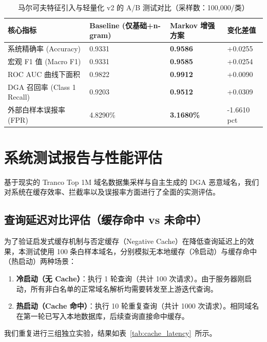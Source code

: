 \documentclass[11pt,a4paper]{ctexart}
\begin{document}
\begin{table}[H]
    \centering
    \color{Charcoal}
    \caption{马尔可夫特征引入与轻量化 v2 的 A/B 测试对比（采样数：100,000/类）}
    \vspace{0.2cm}
    \begin{tabularx}{\textwidth}{lXXX}
        \toprule
        \textbf{核心指标} & \textbf{Baseline (仅基础+n-gram)} & \textbf{Markov 增强方案} & \textbf{变化差值} \\
        \midrule
        系统精确率 (Accuracy) & 0.9331 & \textbf{0.9586} & +0.0255 \\
        宏观 F1 值 (Macro F1) & 0.9331 & \textbf{0.9585} & +0.0254 \\
        ROC AUC 曲线下面积 & 0.9822 & \textbf{0.9912} & +0.0090 \\
        DGA 召回率 (Class 1 Recall) & 0.9203 & \textbf{0.9512} & +0.0309 \\
        外部白样本误报率 (FPR) & 4.8290\% & \textbf{3.1680\%} & -1.6610 pct \\
        \bottomrule
    \end{tabularx}
    \label{tab:ab_test}
\end{table}

\newpage

\section{系统测试报告与性能评估}
基于现实的 Tranco Top 1M 域名数据集采样与自主生成的 DGA 恶意域名，我们对系统在缓存效率、拦截率以及误报率方面进行了全面的实测评估。

\subsection{查询延迟对比评估（缓存命中 vs 未命中）}
为了验证启发式缓存机制与否定缓存（Negative Cache）在降低查询延迟上的效果，本测试使用 100 条白样本域名，分别模拟无本地缓存（冷启动）与缓存命中（热启动）两种场景：
\begin{enumerate}
    \item \textbf{冷启动（无 Cache）}：执行 1 轮查询（共计 100 次请求）。由于服务器刚启动，所有非白名单的正常域名解析均需要转发至上游迭代查询。
    \item \textbf{热启动（Cache 命中）}：执行 10 轮重复查询（共计 1000 次请求）。相同域名在第一轮已写入本地数据库，后续查询直接命中缓存。
\end{enumerate}
我们重复进行三组独立实验，结果如表~\ref{tab:cache_latency}~所示。
\end{document}

